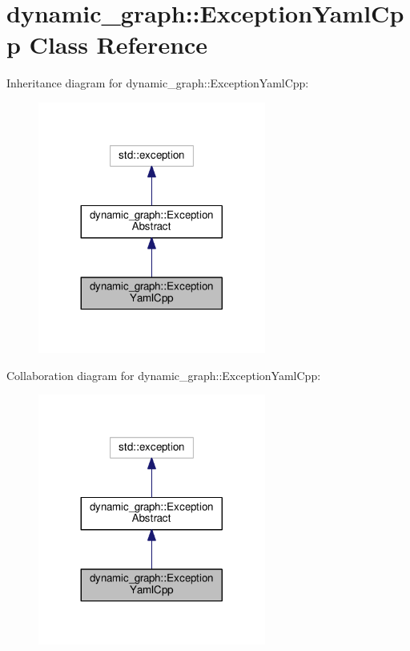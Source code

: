 \hypertarget{classdynamic__graph_1_1ExceptionYamlCpp}{}\section{dynamic\+\_\+graph\+:\+:Exception\+Yaml\+Cpp Class Reference}
\label{classdynamic__graph_1_1ExceptionYamlCpp}


Inheritance diagram for dynamic\+\_\+graph\+:\+:Exception\+Yaml\+Cpp\+:\nopagebreak
\begin{figure}[H]
\begin{center}
\leavevmode
\includegraphics[width=212pt]{classdynamic__graph_1_1ExceptionYamlCpp__inherit__graph}
\end{center}
\end{figure}


Collaboration diagram for dynamic\+\_\+graph\+:\+:Exception\+Yaml\+Cpp\+:\nopagebreak
\begin{figure}[H]
\begin{center}
\leavevmode
\includegraphics[width=212pt]{classdynamic__graph_1_1ExceptionYamlCpp__coll__graph}
\end{center}
\end{figure}
